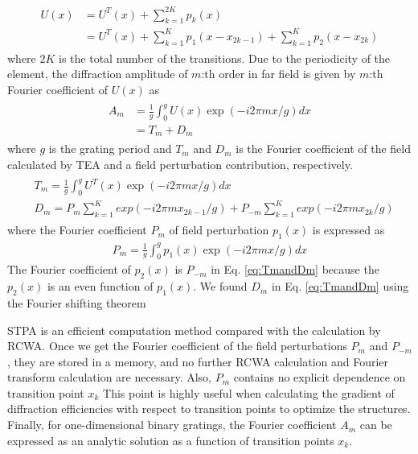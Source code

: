 \begin{align}\label{eq:totalfield}
\begin{split}
U(x) &= U^{T}(x) + \sum_{k=1}^{2K}p_{k}(x)\\
     &= U^{T}(x) + \sum_{k=1}^{K}p_{1}(x-x_{2k-1}) + \sum_{k=1}^{K}p_{2}(x-x_{2k})   
\end{split}
\end{align}
where $2K$ is the total number of the transitions.
Due to the periodicity of the element, the diffraction amplitude of $m$:th order in far field is given by $m$:th Fourier coefficient of $U(x)$ as
\begin{align}
\begin{split}\label{eq:fourier}
A_{m} &= \frac{1}{g}\int_{0}^{g}U(x)\exp(-i2\pi mx/g)dx \\
&= T_{m} + D_{m}
\end{split}
\end{align}
where $g$ is the grating period and $T_{m}$ and $D_{m}$ is the Fourier coefficient of the field calculated by TEA and a field perturbation contribution, respectively.
\begin{align}\label{eq:TmandDm}
\begin{split}
&T_{m} = \frac{1}{g}\int_{0}^{g}U^{T}(x)\exp(-i2\pi mx/g)dx\\
&D_{m} = P_{m}\sum_{k=1}^{K} exp(-i2\pi m x_{2k-1}/g) + P_{-m}\sum_{k=1}^{K} exp(-i2\pi m x_{2k}/g)
\end{split}
\end{align}
where the Fourier coefficient $P_{m}$ of field perturbation $p_{1}(x)$ is expressed as
\begin{align}\label{eq:FCperturbation}
P_{m} = \frac{1}{g}\int_{0}^{g} p_{1}(x) \exp(-i2\pi m x/g)dx
\end{align}
The Fourier coefficient of $p_{2}(x)$ is $P_{-m}$ in Eq. \ref{eq:TmandDm} because the $p_{2}(x)$ is an even function of $p_{1}(x)$. 
We found $D_m$ in Eq. \ref{eq:TmandDm} using the Fourier shifting theorem%

STPA is an efficient computation method compared with the calculation by RCWA.
Once we get the Fourier coefficient of the field perturbations $P_{m}$ and $P_{-m}$, they are stored in a memory, and no further RCWA calculation and Fourier transform calculation are necessary.
Also, $P_m$ contains no explicit dependence on transition point $x_{k}$
This point is highly useful when calculating the gradient of diffraction efficiencies with respect to transition points to optimize the structures. 
Finally, for one-dimensional binary gratings, the Fourier coefficient $A_m$ can be expressed as an analytic solution as a function of transition points $x_{k}$.

